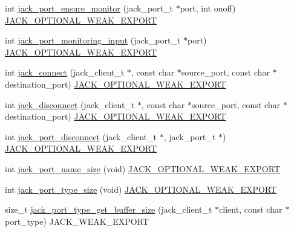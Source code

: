\begin{DoxyCompactItemize}
\item 
int \hyperlink{group__PortFunctions_ga75f0438ba447ad96ae890c1922e4af0d}{jack\-\_\-port\-\_\-ensure\-\_\-monitor} (jack\-\_\-port\-\_\-t $\ast$port, int onoff) \hyperlink{weakmacros_8h_adf1bde0dd996bbf61a44311165014dd1}{\-J\-A\-C\-K\-\_\-\-O\-P\-T\-I\-O\-N\-A\-L\-\_\-\-W\-E\-A\-K\-\_\-\-E\-X\-P\-O\-R\-T}
\item 
int \hyperlink{group__PortFunctions_ga5e52890253590c913913765edf0f9606}{jack\-\_\-port\-\_\-monitoring\-\_\-input} (jack\-\_\-port\-\_\-t $\ast$port) \hyperlink{weakmacros_8h_adf1bde0dd996bbf61a44311165014dd1}{\-J\-A\-C\-K\-\_\-\-O\-P\-T\-I\-O\-N\-A\-L\-\_\-\-W\-E\-A\-K\-\_\-\-E\-X\-P\-O\-R\-T}
\item 
int \hyperlink{group__PortFunctions_gae6090e81f2ee23b5c0e432a899085ec8}{jack\-\_\-connect} (jack\-\_\-client\-\_\-t $\ast$, const char $\ast$source\-\_\-port, const char $\ast$destination\-\_\-port) \hyperlink{weakmacros_8h_adf1bde0dd996bbf61a44311165014dd1}{\-J\-A\-C\-K\-\_\-\-O\-P\-T\-I\-O\-N\-A\-L\-\_\-\-W\-E\-A\-K\-\_\-\-E\-X\-P\-O\-R\-T}
\item 
int \hyperlink{group__PortFunctions_gaf2bd9f649c51dafdb382847f0c15963f}{jack\-\_\-disconnect} (jack\-\_\-client\-\_\-t $\ast$, const char $\ast$source\-\_\-port, const char $\ast$destination\-\_\-port) \hyperlink{weakmacros_8h_adf1bde0dd996bbf61a44311165014dd1}{\-J\-A\-C\-K\-\_\-\-O\-P\-T\-I\-O\-N\-A\-L\-\_\-\-W\-E\-A\-K\-\_\-\-E\-X\-P\-O\-R\-T}
\item 
int \hyperlink{group__PortFunctions_ga92f84d611d7dea399bc97516799ef89d}{jack\-\_\-port\-\_\-disconnect} (jack\-\_\-client\-\_\-t $\ast$, jack\-\_\-port\-\_\-t $\ast$) \hyperlink{weakmacros_8h_adf1bde0dd996bbf61a44311165014dd1}{\-J\-A\-C\-K\-\_\-\-O\-P\-T\-I\-O\-N\-A\-L\-\_\-\-W\-E\-A\-K\-\_\-\-E\-X\-P\-O\-R\-T}
\item 
int \hyperlink{group__PortFunctions_gabaebfd70bedfaecc834ebb02f4546eb1}{jack\-\_\-port\-\_\-name\-\_\-size} (void) \hyperlink{weakmacros_8h_adf1bde0dd996bbf61a44311165014dd1}{\-J\-A\-C\-K\-\_\-\-O\-P\-T\-I\-O\-N\-A\-L\-\_\-\-W\-E\-A\-K\-\_\-\-E\-X\-P\-O\-R\-T}
\item 
int \hyperlink{group__PortFunctions_ga8acf71c319f50c5789f7454e4b6ef2e5}{jack\-\_\-port\-\_\-type\-\_\-size} (void) \hyperlink{weakmacros_8h_adf1bde0dd996bbf61a44311165014dd1}{\-J\-A\-C\-K\-\_\-\-O\-P\-T\-I\-O\-N\-A\-L\-\_\-\-W\-E\-A\-K\-\_\-\-E\-X\-P\-O\-R\-T}
\item 
size\-\_\-t \hyperlink{group__PortFunctions_ga52a65a0dd00695ecf75e23f1bd48f96a}{jack\-\_\-port\-\_\-type\-\_\-get\-\_\-buffer\-\_\-size} (jack\-\_\-client\-\_\-t $\ast$client, const char $\ast$port\-\_\-type) \-J\-A\-C\-K\-\_\-\-W\-E\-A\-K\-\_\-\-E\-X\-P\-O\-R\-T
\end{DoxyCompactItemize}


